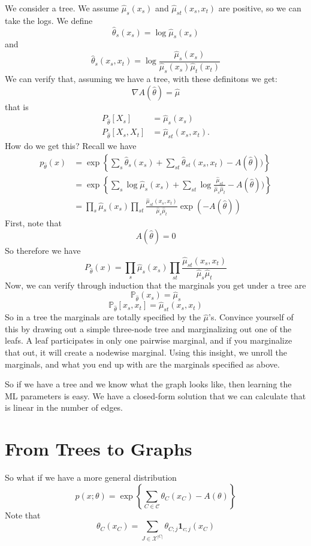 \documentclass{article}
\begin{document}
We consider a tree.
We assume
$
\hat\mu_s(x_s)$ and $ \hat\mu_{st}(x_s,x_t)
$
are positive, so we can take the logs.
We define
$$
\hat\theta_s(x_s)
=
\log\hat \mu_s (x_s)
$$
and
$$
\hat\theta_s(x_s, x_t)
=
	\log
	\frac{
	\hat \mu_s (x_s)
	}{
	\hat\mu_s(x_s) \hat\mu_t (x_t)
	}
$$
We can verify that, assuming we have a tree, with these definitons we get: 
$$
\nabla A(\hat\theta) = \hat\mu
$$
that is
\begin{align}
P_{\hat\theta}[X_s] &= \hat\mu_s(x_s)
\\
P_{\hat\theta}[X_s, X_t] &= \hat\mu_{st}(x_s, x_t).
\end{align}
How do we get this?
Recall we have
\begin{align}
p_{\hat\theta}(x) &= 
\exp
\left\{
\sum_s \hat\theta_s(x_s) +
\sum_{st} \hat\theta_{st}(x_s, x_t) - A(\hat\theta))
\right\}
\\
&=
\exp
\left\{
\sum_s \log\hat\mu_s(x_s) +
\sum_{st} \log\frac{\hat\mu_{st}}{ \hat\mu_s \hat\mu_t}
 - A(\hat\theta))
\right\}
\\
&=
\prod_s 
\hat\mu_s (x_s)
\prod_{st}
\frac{\hat\mu_{st}(x_s, x_t)}{\hat\mu_s \hat\mu_t}
\exp(-A(\hat\theta))
\label{treeeq}
\end{align}
First, note that
$$
A(\hat\theta) = 0
$$
So therefore we have
$$
P_{\hat\theta}(x)
=
\prod_s 
\hat\mu_s (x_s)
\prod_{st}
\frac{\hat\mu_{st}(x_s, x_t)}{\hat\mu_s \hat\mu_t}
$$
Now, we can verify through induction that the marginals you get under a tree are
$$
\mathbb P _{\hat\theta}(x_s) = \hat\mu_s
$$
$$
\mathbb P _{\hat\theta}[x_s, x_t] = \hat\mu_{st}(x_s, x_t)
$$
So in a tree the marginals are totally specified by the $\hat\mu$'s.
Convince yourself of this by drawing out a simple three-node tree and marginalizing out one of the leafs.
A leaf participates in only one pairwise marginal, and if you marginalize that out, it will create a nodewise marginal.
Using this insight, we unroll the marginals, and what you end up with are the marginals specified as above.


So if we have a tree and we know what the graph looks like, then learning the ML parameters is easy.
We have a closed-form solution that we can calculate that is linear in the number of edges.

\section{From Trees to Graphs}

So what if we have a more general distribution
$$
p(x;\theta) = 
\exp\left\{
\sum_{C\in\mathcal C}
\theta_C(x_C) 
- A(\theta)
\right\}
$$
Note that
$$
\theta_C(x_C) =
\sum_{J\in \mathcal X^{|C|}} \theta_{C;j} \mathbf 1_{c;j}(x_C)
$$
\end{document}
